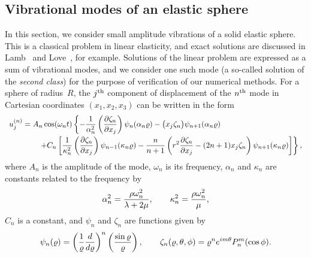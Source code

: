 \newcommand{\sphereEigenDir}{\homeHenshaw/cgDoc/sm/sphereEigen}
\newcommand{\rad}{\varrho}
\newcommand{\om}{\zeta}
\newcommand{\hh}{\alpha}
\newcommand{\ph}{\chi}
\subsection{Vibrational modes of an elastic sphere}\label{sec:sphereVibrations}

In this section, we consider small amplitude vibrations of a solid elastic sphere.  This is a classical
problem in linear elasticity, and exact solutions are discussed in Lamb~\cite{Lamb1882} and Love~\cite{Love1944},
for example.  Solutions of the linear problem are expressed as a sum of vibrational modes,
and we consider one such mode (a so-called solution of the {\em second class}) for the purpose
of verification of our numerical methods.  For a sphere of radius~$R$, the $j\sp{{\rm th}}$
component of displacement of the $n\sp{{\rm th}}$ mode in Cartesian coordinates $(x_1,x_2,x_3)$ can be written in the form
\begin{equation}
\begin{array}{l}
\displaystyle{
u_j\sp{(n)} = A_n \cos(\omega_n t)\left\{
-{1\over \hh_n^2}\left({\partial \om_n \over \partial x_j }\right) \psi_n(\hh_n\rad)  
       - \bigl(x_j \om_n\bigr) \psi_{n+1}(\hh_n\rad) \right.
} \smallskip\\
\qquad\qquad\displaystyle{
\left. +C_n\left[{1\over \kappa_n^2}\left({\partial \om_{n} \over \partial x_j }\right)\psi_{n-1}(\kappa_n\rad)  
     - {n\over n+1}\left(r^2 {\partial \om_n \over \partial x_j } -(2n+1) x_j \om_n\right)
       \psi_{n+1}(\kappa_n\rad)\right]\right\},
}
\end{array}
\label{eq:secondClassSolution}
\end{equation}
where $A_n$ is the amplitude of the mode, $\omega_n$ is its frequency, $\hh_n$ and $\kappa_n$ are constants related to the frequency by
\begin{equation}
\hh_n\sp2={\rho\omega_n\sp2\over\lambda+2\mu},\qquad \kappa_n\sp2={\rho\omega_n\sp2\over\mu},
\label{eq:alphaKappa}
\end{equation}
$C_n$ is a constant, and $\psi_n$ and $\om_n$ are functions given by
\begin{equation}
\psi_n(\rad) = \left({1\over\rad}{d\over d\rad}\right)^n \left({\sin\rad\over\rad}\right),\qquad
\om_n(\rad,\theta,\phi) = \rad^n e^{im\theta} P_n^m(\cos\phi).
\label{eq:sphereFunctions}
\end{equation}
